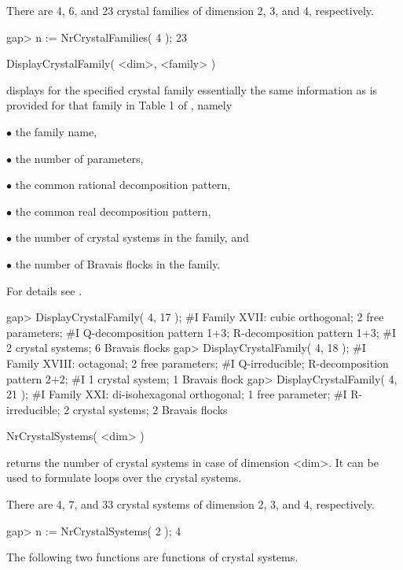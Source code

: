 There are 4, 6, and 23 crystal families of dimension 2, 3, and 4,
respectively.

\beginexample
gap> n := NrCrystalFamilies( 4 );
23
\endexample

\>DisplayCrystalFamily( <dim>, <family> )

displays for the specified crystal family essentially the same
information as is provided for that family in Table 1 of
\cite{BBNWZ78}, namely

\beginlist
\item{$\bullet$} the family name,

\item{$\bullet$} the number of parameters,

\item{$\bullet$} the common rational decomposition pattern,

\item{$\bullet$} the common real decomposition pattern,

\item{$\bullet$} the number of crystal systems in the family, and

\item{$\bullet$} the number of Bravais flocks in the family.
\endlist

For details see \cite{BBNWZ78}.

\beginexample
gap> DisplayCrystalFamily( 4, 17 );
#I Family XVII: cubic orthogonal; 2 free parameters;
#I  Q-decomposition pattern 1+3; R-decomposition pattern 1+3;
#I  2 crystal systems; 6 Bravais flocks
gap> DisplayCrystalFamily( 4, 18 );
#I Family XVIII: octagonal; 2 free parameters;
#I  Q-irreducible; R-decomposition pattern 2+2;
#I  1 crystal system; 1 Bravais flock
gap> DisplayCrystalFamily( 4, 21 );
#I Family XXI: di-isohexagonal orthogonal; 1 free parameter;
#I  R-irreducible; 2 crystal systems; 2 Bravais flocks
\endexample


\>NrCrystalSystems( <dim> )

returns the number of crystal systems in case of dimension <dim>. It
can be used to formulate loops over the crystal systems.

There are 4, 7, and 33 crystal systems of dimension 2, 3, and 4,
respectively.

\beginexample
gap> n := NrCrystalSystems( 2 );
4
\endexample

The following two functions are functions of crystal systems.


